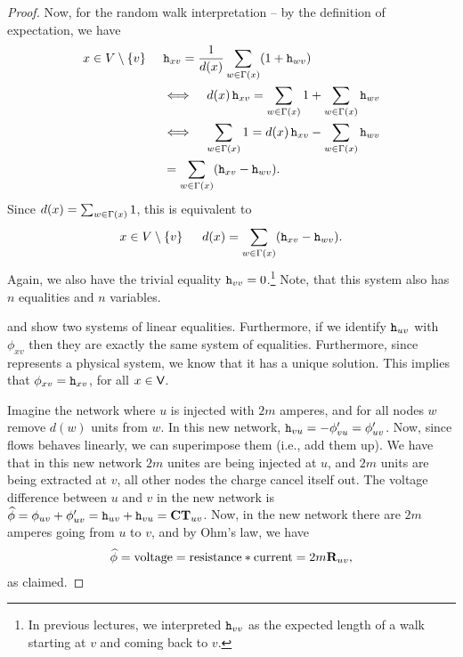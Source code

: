 \begin{proof}
    Now, for the random walk interpretation -- by the definition of
    expectation, we have
    \begin{align*}
        x \in V \setminus \brc{v} \;\;\;\;\; &\MCExSteps{x}{v} =
        \frac{1}{d(x)}\sum_{w \in \Nbr(x)} \pth{1 + \MCExSteps{w}{v}}%
        \\
        &\Longleftrightarrow \;\;\;\;%
        d(x)\, \MCExSteps{x}{v} = \sum_{w
           \in \Nbr(x)} 1 + \sum_{w \in \Nbr(x)}\MCExSteps{w}{v}\\
        &%
        \Longleftrightarrow \;\;\;\; %
        \sum_{w \in \Nbr(x)} 1 = d(x)\, \MCExSteps{x}{v} - \sum_{w \in
           \Nbr(x)}\MCExSteps{w}{v}\\
        &= \sum_{w \in \Nbr(x)} \pth{
           \MCExSteps{x}{v} - \MCExSteps{w}{v}}.
    \end{align*}
    Since $d(x) = \sum_{w \in \Gamma(x)} 1$, this is equivalent to
    \begin{align}
        x \in V \setminus \brc{v} \;\;\;\;\; d(x) = \sum_{w \in
           \Nbr(x)} \pth{ \MCExSteps{x}{v} - \MCExSteps{w}{v}}.
        \eqlab{hitting:time}
    \end{align}
    Again, we also have the trivial equality
    $\mathtt{h}_{vv}=0$.\footnote{%
       In previous lectures, we interpreted $\mathtt{h}_{vv}$ as the
       expected length of a walk starting at $v$ and coming back to
       $v$.} Note, that this system also has $n$ equalities and $n$
    variables.
    
     and  show two systems of
    linear equalities. Furthermore, if we identify $\mathtt{h}_{uv}$
    with $\phi_{xv}$ then they are exactly the same system of
    equalities.  Furthermore, since  represents a
    physical system, we know that it has a unique solution.  This
    implies that $\phi_{x v} = \mathtt{h}_{xv}$, for all $x \in
    \mathsf{V}$.
    
    Imagine the network where $u$ is injected with $2m$ amperes, and
    for all nodes $w$ remove $d(w)$ units from $w$. In this new
    network, $\mathtt{h}_{vu} = - \phi_{vu}' = \phi_{uv}'$.  Now,
    since flows behaves linearly, we can superimpose them (i.e., add
    them up). We have that in this new network $2m$ unites are being
    injected at $u$, and $2m$ units are being extracted at $v$, all
    other nodes the charge cancel itself out. The voltage difference
    between $u$ and $v$ in the new network is $\widehat{\phi} =
    \phi_{uv} + \phi_{uv}' = \mathtt{h}_{uv} + \mathtt{h}_{vu} =
    \mathbf{CT}_{uv}$. Now, in the new network there are $2m$
    amperes going from $u$ to $v$, and by Ohm's law, we have
    \begin{align*}
        \widehat{\phi} = \mathrm{voltage} = \mathrm{resistance} *
        \mathrm{current} = 2m \mathbf{R}_{uv},
    \end{align*}
    as claimed.
\end{proof}


